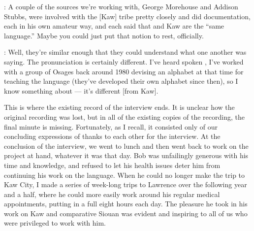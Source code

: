 \documentclass[output=paper]{LSP/langsci}
\begin{document}
: A couple of the sources we're working with, George Morehouse and Addison Stubbs, were involved with the [Kaw] tribe pretty closely and did documentation, each in his own amateur way, and each said that  and Kaw are the ``same language.'' Maybe you could just put that notion to rest, officially.

: Well, they're similar enough that they could understand what one another was saying. The pronunciation is certainly different. I've heard spoken , I've worked with a group of Osages back around 1980 devising an alphabet at that time for teaching the language (they've developed their own alphabet since then), so I know something about  --- it's different [from Kaw].

\noindent This is where the existing record of the interview ends. It is unclear how the original recording was lost, but in all of the existing copies of the recording, the final minute is missing. Fortunately, as I recall, it consisted only of our concluding expressions of thanks to each other for the interview. At the conclusion of the interview, we went to lunch and then went back to work on the project at hand, whatever it was that day. Bob was unfailingly generous with his time and knowledge, and refused to let his health issues deter him from continuing his work on the language. When he could no longer make the trip to Kaw City, I made a series of week-long trips to Lawrence over the following year and a half, where he could more easily work around his regular medical appointments, putting in a full eight hours each day. The pleasure he took in his work on Kaw and comparative Siouan was evident and inspiring to all of us who were privileged to work with him. 

\printbibliography[heading=subbibliography,notkeyword=this] 
\end{document}
